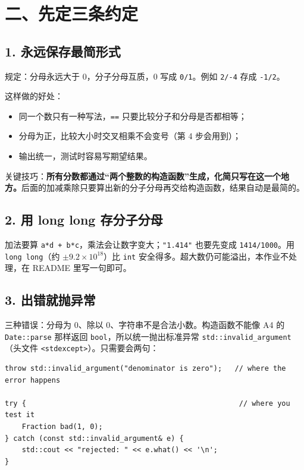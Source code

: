 \documentclass[11pt,a4paper]{article}
\newcommand{\code}[1]{\texttt{#1}}
\begin{document}
\section{二、先定三条约定}

\subsection{1. 永远保存最简形式}

规定：分母永远大于 0，分子分母互质，0 写成 \code{0/1}。例如 \code{2/-4} 存成 \code{-1/2}。

这样做的好处：
\begin{itemize}
  \item 同一个数只有一种写法，\code{==} 只要比较分子和分母是否都相等；
  \item 分母为正，比较大小时交叉相乘不会变号（第 4 步会用到）；
  \item 输出统一，测试时容易写期望结果。
\end{itemize}

关键技巧：\textbf{所有分数都通过“两个整数的构造函数”生成，化简只写在这一个地方。}后面的加减乘除只要算出新的分子分母再交给构造函数，结果自动是最简的。

\subsection{2. 用 long long 存分子分母}

加法要算 \code{a*d + b*c}，乘法会让数字变大；\code{"1.414"} 也要先变成 \code{1414/1000}。用 \code{long long}（约 $\pm 9.2\times10^{18}$）比 \code{int} 安全得多。超大数仍可能溢出，本作业不处理，在 README 里写一句即可。

\subsection{3. 出错就抛异常}

三种错误：分母为 0、除以 0、字符串不是合法小数。构造函数不能像 A4 的 \code{Date::parse} 那样返回 \code{bool}，所以统一抛出标准异常 \code{std::invalid\_argument}（头文件 \code{<stdexcept>}）。只需要会两句：

\begin{lstlisting}
throw std::invalid_argument("denominator is zero");   // where the error happens

try {                                                  // where you test it
    Fraction bad(1, 0);
} catch (const std::invalid_argument& e) {
    std::cout << "rejected: " << e.what() << '\n';
}
\end{lstlisting}
\end{document}
